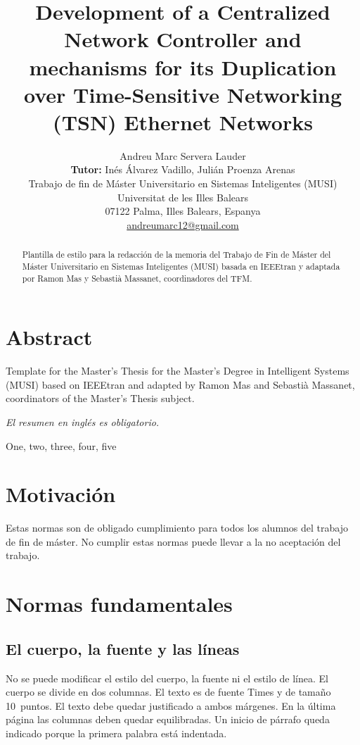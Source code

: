 \documentclass[twocolumn,twoside,a4paper, 10pt]{IEEEtran}
\title{Development of a Centralized Network Controller and mechanisms for its Duplication over Time-Sensitive Networking (TSN) Ethernet Networks}
\author{\normalsize 
{\large Andreu Marc Servera Lauder } \\
 \textbf{Tutor:}  {\large Inés Álvarez Vadillo, Julián Proenza Arenas} \\
Trabajo de fin de Máster Universitario en Sistemas Inteligentes (MUSI)\\
Universitat de les Illes Balears \\
07122 Palma, Illes Balears, Espanya \\
\url{andreumarc12@gmail.com}
}
\begin{document}
\thispagestyle{empty}
\maketitle
\thispagestyle{empty}


\begin{abstract}
\noindent Plantilla de estilo para la redacción de la memoria del Trabajo de Fin de Máster del Máster Universitario en Sistemas Inteligentes (MUSI) basada en IEEEtran y adaptada por Ramon Mas y Sebastià Massanet, coordinadores del TFM.
\end{abstract}

\section*{Abstract}
\noindent  Template for the Master's Thesis for the Master's Degree in Intelligent Systems (MUSI) based on IEEEtran and adapted by Ramon Mas and Sebastià Massanet, coordinators of the Master's Thesis subject.\par
\noindent  \textit{El resumen en inglés es obligatorio.}


\begin{keywords}
One, two, three, four, five
\end{keywords}

\section{Motivación}

Estas normas son de obligado cumplimiento para todos los alumnos del trabajo de fin de máster.  No cumplir estas normas puede llevar a la no aceptación del trabajo. 

\section{Normas fundamentales \label{sec:fund}} 

\subsection{El cuerpo, la fuente y las líneas}

No se puede modificar el estilo del cuerpo, la fuente ni el estilo de línea. El cuerpo se divide en dos columnas. El texto es de fuente Times y de tamaño 10~puntos. El texto debe quedar justificado a ambos márgenes. En la última página las columnas deben quedar equilibradas. Un inicio de párrafo queda indicado porque la primera palabra está indentada.
\end{document}
